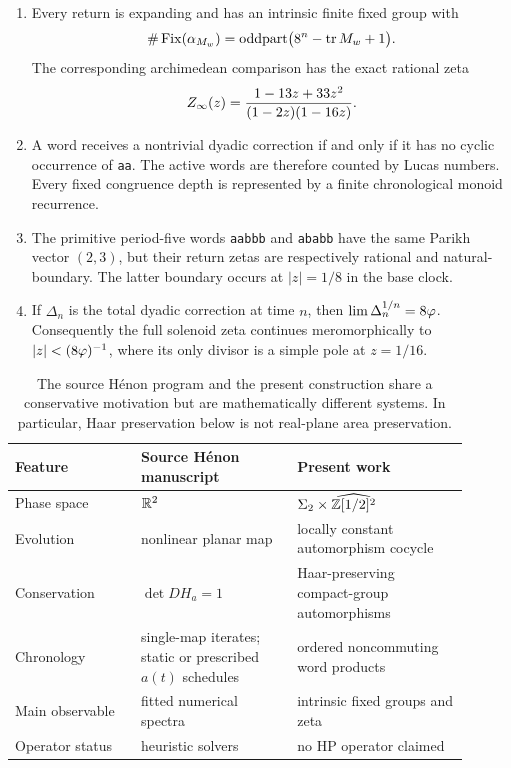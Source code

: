 \begin{enumerate}[leftmargin=*,label=(\roman*)]
\item Every return is expanding and has an intrinsic finite fixed group with
\[
 \#\operatorname{Fix}(\alpha_{M_w})
 =\operatorname{oddpart}\bigl(8^n-\operatorname{tr} M_w+1\bigr).
\]
The corresponding archimedean comparison has the exact rational zeta
\[
 Z_{\infty}(z)=\frac{1-13z+33z^2}{(1-2z)(1-16z)}.
\]

\item A word receives a nontrivial dyadic correction if and only if it has no
cyclic occurrence of \texttt{aa}.  The active words are therefore counted by
Lucas numbers.  Every fixed congruence depth is represented by a finite
chronological monoid recurrence.

\item The primitive period-five words \texttt{aabbb} and \texttt{ababb} have
the same Parikh vector \((2,3)\), but their return zetas are respectively
rational and natural-boundary.  The latter boundary occurs at \(|z|=1/8\) in
the base clock.

\item If \(\Delta_n\) is the total dyadic correction at time \(n\), then
\(\lim \Delta_n^{1/n}=8\varphi\).  Consequently the full solenoid zeta
continues meromorphically to \(|z|<(8\varphi)^{-1}\), where its only divisor
is a simple pole at \(z=1/16\).
\end{enumerate}

\begin{table}[t]
\centering
\small
\caption{The source H\'enon program and the present construction share a
conservative motivation but are mathematically different systems.  In
particular, Haar preservation below is not real-plane area preservation.}
\label{tab:pivot}
\begin{tabular}{p{0.25\linewidth}p{0.31\linewidth}p{0.34\linewidth}}
\toprule
Feature & Source H\'enon manuscript & Present work \\
\midrule
Phase space & \(\mathbb{R}^2\) & \(\Sigma_2\times\widehat{\mathbb{Z}[1/2]^2}\) \\
Evolution & nonlinear planar map & locally constant automorphism cocycle \\
Conservation & \(\det D H_a=1\) & Haar-preserving compact-group automorphisms \\
Chronology & single-map iterates; static or prescribed \(a(t)\) schedules & ordered noncommuting word products \\
Main observable & fitted numerical spectra & intrinsic fixed groups and zeta \\
Operator status & heuristic solvers & no HP operator claimed \\
\bottomrule
\end{tabular}
\end{table}

